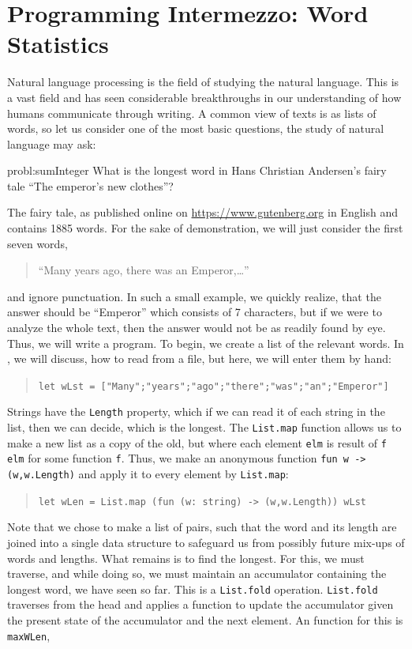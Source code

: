 \documentclass[fsharpNotes.tex]{subfiles}
\begin{document}
\section{Programming Intermezzo: Word Statistics}
Natural language processing is the field of studying the natural language. This is a vast field and has seen considerable breakthroughs in our understanding of how humans communicate through writing. A common view of texts is as lists of words, so let us consider one of the most basic questions, the study of natural language may ask:
%
\begin{task}{probl:sumInteger}
  What is the longest word in Hans Christian Andersen's fairy tale ``The emperor's new clothes''?
\end{task}
%
The fairy tale, as published online on \url{https://www.gutenberg.org} in English and contains 1885 words. For the sake of demonstration, we will just consider the first seven words,
\begin{quote}
  ``Many years ago, there was an Emperor,\dots''
\end{quote}
and ignore punctuation. In such a small example, we quickly realize, that the answer should be ``Emperor'' which consists of 7 characters, but if we were to analyze the whole text, then the answer would not be as readily found by eye. Thus, we will write a program. To begin, we create a list of the relevant words. In , we will discuss, how to read from a file, but here, we will enter them by hand:
\begin{quote}
  \lstinline{let wLst = ["Many";"years";"ago";"there";"was";"an";"Emperor"]}
\end{quote}
Strings have the \lstinline{Length} property, which if we can read it of each string in the list, then we can decide, which is the longest. The \lstinline{List.map} function allows us to make a new list as a copy of the old, but where each element \lstinline{elm} is result of \lstinline{f elm} for some function \lstinline{f}. Thus, we make an anonymous function \lstinline{fun w -> (w,w.Length)} and apply it to every element by \lstinline{List.map}:
\begin{quote}
  \lstinline{let wLen = List.map (fun (w: string) -> (w,w.Length)) wLst}
\end{quote}
Note that we chose to make a list of pairs, such that the word and its length are joined into a single data structure to safeguard us from possibly future mix-ups of words and lengths. What remains is to find the longest. For this, we must traverse, and while doing so, we must maintain an accumulator containing the longest word, we have seen so far. This is a \lstinline{List.fold} operation. \lstinline{List.fold} traverses from the head and applies a function to update the accumulator given the present state of the accumulator and the next element. An function for this is \lstinline{maxWLen},
\end{document}
